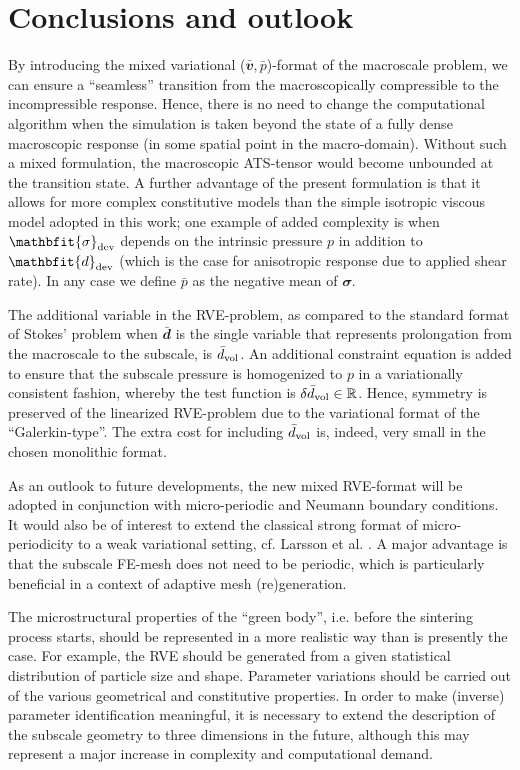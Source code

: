 \documentclass[10pt,a4paper,fleqn]{article}
\renewcommand{\ts}[1]{\mathbfit{#1}}
\begin{document}
\section{Conclusions and outlook}\label{sec:conlusions}

By introducing the mixed variational ($\bar{\ts v},\bar{p}$)-format of the macroscale problem, we can ensure a ``seamless'' transition from the macroscopically compressible to the incompressible response. Hence, there is no need to change the computational algorithm when the simulation is taken beyond the state of a fully dense macroscopic response (in some spatial point in the macro-domain). Without such a mixed formulation, the macroscopic ATS-tensor would become unbounded at the transition state. A further advantage of the present formulation is that it allows for more complex constitutive models than the simple isotropic viscous model adopted in this work; one example of added complexity is when $\ts\sigma_\dev$ depends on the intrinsic pressure $p$ in addition to $\ts d_\dev$ (which is the case for anisotropic response due to applied shear rate). In any case we define $\bar{p}$ as the negative mean of $\ts\sigma$.

The additional variable in the RVE-problem, as compared to the standard format of Stokes' problem when $\bar{\ts d}$ is the single variable that represents prolongation from the macroscale to the subscale, is $\bar d_{\mathrm{vol}}$. An additional constraint equation is added to ensure that the subscale pressure is homogenized to $p$ in a variationally consistent fashion, whereby the test function is $\delta\bar d_{\mathrm{vol}}\in\mathbb{R}$. Hence, symmetry is preserved of  the linearized RVE-problem due to the variational format of the ``Galerkin-type''. The extra cost for including $\bar d_{\mathrm{vol}}$ is, indeed, very small in the chosen monolithic format. 

As an outlook to future developments, the new mixed RVE-format will be adopted in conjunction with micro-periodic and Neumann boundary conditions.
It would also be of interest to extend the classical strong format of micro-periodicity to a weak variational setting, cf. Larsson et al. \cite{Larsson_etal2011}.
A major advantage is that the subscale FE-mesh does not need to be periodic, which is particularly beneficial in a context of adaptive mesh (re)generation. 

The microstructural properties of the ``green body'', i.e. before the sintering process starts, should be represented in a more realistic way than is presently the case.
For example, the RVE should be generated from a given statistical distribution of particle size and shape.
Parameter variations should be carried out of the various geometrical and constitutive properties.
In order to make (inverse) parameter identification meaningful, it is necessary to extend the description of the subscale geometry to three dimensions in the future, although this may represent a major increase in complexity and computational demand. 
\end{document}
